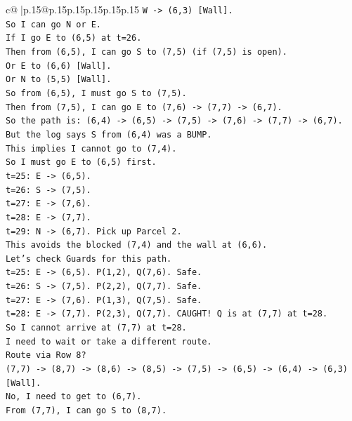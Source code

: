 \documentclass{article}
\begin{document}
{\begin{supertabular}{c@{$\;$}|p{.15\linewidth}@{}p{.15\linewidth}p{.15\linewidth}p{.15\linewidth}p{.15\linewidth}p{.15\linewidth}}
{{{\texttt{W {-}> (6,3) {[}Wall{]}.} \\
\texttt{So I can go N or E.} \\
\texttt{If I go E to (6,5) at t=26.} \\
\texttt{Then from (6,5), I can go S to (7,5) (if (7,5) is open).} \\
\texttt{Or E to (6,6) {[}Wall{]}.} \\
\texttt{Or N to (5,5) {[}Wall{]}.} \\
\texttt{So from (6,5), I must go S to (7,5).} \\
\texttt{Then from (7,5), I can go E to (7,6) {-}> (7,7) {-}> (6,7).} \\
\texttt{So the path is: (6,4) {-}> (6,5) {-}> (7,5) {-}> (7,6) {-}> (7,7) {-}> (6,7).} \\
\texttt{But the log says S from (6,4) was a BUMP.} \\
\texttt{This implies I cannot go to (7,4).} \\
\texttt{So I must go E to (6,5) first.} \\
\texttt{t=25: E {-}> (6,5).} \\
\texttt{t=26: S {-}> (7,5).} \\
\texttt{t=27: E {-}> (7,6).} \\
\texttt{t=28: E {-}> (7,7).} \\
\texttt{t=29: N {-}> (6,7). Pick up Parcel 2.} \\
\texttt{This avoids the blocked (7,4) and the wall at (6,6).} \\
\texttt{Let's check Guards for this path.} \\
\texttt{t=25: E {-}> (6,5). P(1,2), Q(7,6). Safe.} \\
\texttt{t=26: S {-}> (7,5). P(2,2), Q(7,7). Safe.} \\
\texttt{t=27: E {-}> (7,6). P(1,3), Q(7,5). Safe.} \\
\texttt{t=28: E {-}> (7,7). P(2,3), Q(7,7). CAUGHT! Q is at (7,7) at t=28.} \\
\texttt{So I cannot arrive at (7,7) at t=28.} \\
\texttt{I need to wait or take a different route.} \\
\texttt{Route via Row 8?} \\
\texttt{(7,7) {-}> (8,7) {-}> (8,6) {-}> (8,5) {-}> (7,5) {-}> (6,5) {-}> (6,4) {-}> (6,3) {[}Wall{]}.} \\
\texttt{No, I need to get to (6,7).} \\
\texttt{From (7,7), I can go S to (8,7).} \\
}}}
\end{supertabular}}
\end{document}
